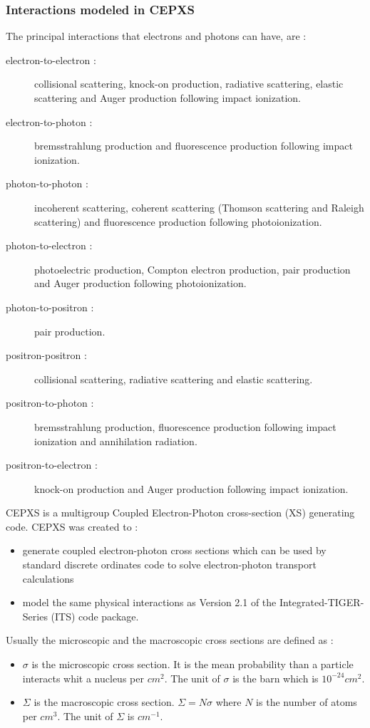 \subsubsection{Interactions modeled in CEPXS}
The principal interactions that electrons and photons can have, are
\cite{cepxs} :
\begin{description}
\item [electron-to-electron :] collisional scattering, knock-on production,
radiative scattering, elastic scattering and Auger production following impact
ionization.
\item [electron-to-photon :] bremsstrahlung production and fluorescence
production following impact ionization.
\item [photon-to-photon :] incoherent scattering, coherent scattering (Thomson 
scattering and Raleigh scattering) and fluorescence production following
photoionization.
\item [photon-to-electron :] photoelectric production, Compton electron
production, pair production and Auger production following photoionization.
\item [photon-to-positron :] pair production.
\item [positron-positron :] collisional scattering, radiative scattering and
elastic scattering.
\item [positron-to-photon :] bremsstrahlung production, fluorescence
production following impact ionization and annihilation radiation.
\item [positron-to-electron :] knock-on production and Auger production
following impact ionization.
\end{description}
CEPXS is a multigroup Coupled Electron-Photon cross-section (XS) generating
code. CEPXS was created to \cite{cepxs} :
\begin{itemize}
\item generate coupled electron-photon cross sections which can be used by
standard discrete ordinates code to solve electron-photon transport
calculations
\item model the same physical interactions as Version 2.1 of the
Integrated-TIGER-Series (ITS) code package.
\end{itemize}
Usually the microscopic and the macroscopic cross sections are defined as 
\cite{barjon} :
\begin{itemize}
\item $\sigma$ is the microscopic cross section. It is the mean probability than a
particle interacts whit a nucleus per $cm^2$. The unit of $\sigma$ is the barn
which is $10^{-24}cm^2$.
\item $\Sigma$ is the macroscopic cross section. $\Sigma = N \sigma$ where $N$
is the number of atoms per $cm^3$. The unit of $\Sigma$ is $cm^{-1}$.
\end{itemize}
